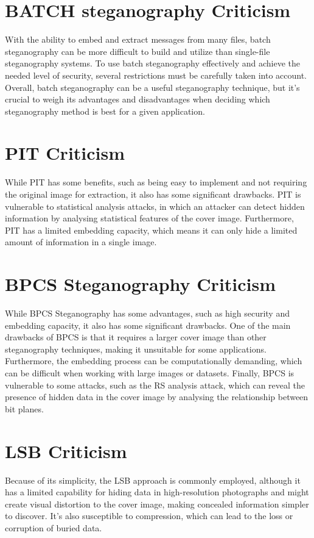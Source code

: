 \section{ BATCH steganography Criticism }
With the ability to embed and extract messages from many files, batch steganography can be more difficult to build and utilize than single-file steganography systems. To use batch steganography effectively and achieve the needed level of security, several restrictions must be carefully taken into account. Overall, batch steganography can be a useful steganography technique, but it's crucial to weigh its advantages and disadvantages when deciding which steganography method is best for a given application.
\section{ PIT Criticism }
While PIT has some benefits, such as being easy to implement and not requiring the original image for extraction, it also has some significant drawbacks. PIT is vulnerable to statistical analysis attacks, in which an attacker can detect hidden information by analysing statistical features of the cover image. Furthermore, PIT has a limited embedding capacity, which means it can only hide a limited amount of information in a single image.

\section{ BPCS Steganography Criticism }
While BPCS Steganography has some advantages, such as high security and embedding capacity, it also has some significant drawbacks. One of the main drawbacks of BPCS is that it requires a larger cover image than other steganography techniques, making it unsuitable for some applications. Furthermore, the embedding process can be computationally demanding, which can be difficult when working with large images or datasets. Finally, BPCS is vulnerable to some attacks, such as the RS analysis attack, which can reveal the presence of hidden data in the cover image by analysing the relationship between bit planes.

\section{ LSB Criticism }
Because of its simplicity, the LSB approach is commonly employed, although it has a limited capability for hiding data in high-resolution photographs and might create visual distortion to the cover image, making concealed information simpler to discover. It's also susceptible to compression, which can lead to the loss or corruption of buried data.


